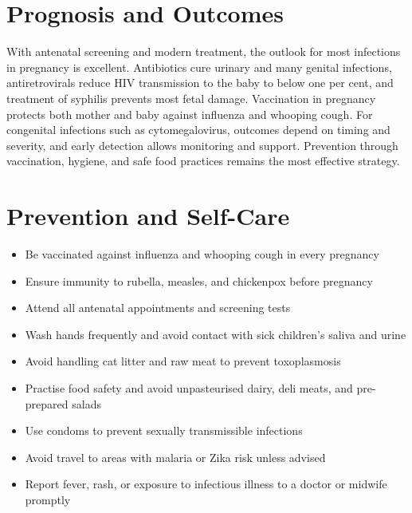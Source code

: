 \section*{Prognosis and Outcomes}
With antenatal screening and modern treatment, the outlook for most infections in pregnancy is excellent. Antibiotics cure urinary and many genital infections, antiretrovirals reduce HIV transmission to the baby to below one per cent, and treatment of syphilis prevents most fetal damage. Vaccination in pregnancy protects both mother and baby against influenza and whooping cough. For congenital infections such as cytomegalovirus, outcomes depend on timing and severity, and early detection allows monitoring and support. Prevention through vaccination, hygiene, and safe food practices remains the most effective strategy.

\section*{Prevention and Self-Care}
\begin{itemize}
    \item Be vaccinated against influenza and whooping cough in every pregnancy
    \item Ensure immunity to rubella, measles, and chickenpox before pregnancy
    \item Attend all antenatal appointments and screening tests
    \item Wash hands frequently and avoid contact with sick children's saliva and urine
    \item Avoid handling cat litter and raw meat to prevent toxoplasmosis
    \item Practise food safety and avoid unpasteurised dairy, deli meats, and pre-prepared salads
    \item Use condoms to prevent sexually transmissible infections
    \item Avoid travel to areas with malaria or Zika risk unless advised
    \item Report fever, rash, or exposure to infectious illness to a doctor or midwife promptly
\end{itemize}

